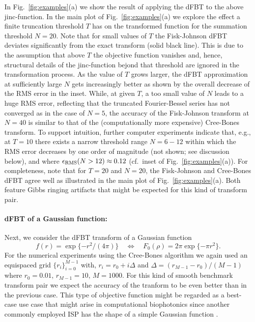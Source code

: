 \documentclass[12pt]{iopart}
\begin{document}
In Fig.~\ref{fig:examples}(a) we show the result of applying the dFBT to the
above {\rm jinc}-function. In the main plot of Fig.~\ref{fig:examples}(a) we
explore the effect a finite truncation threshold $T$ has on the transformed
function for the summation threshold $N=20$. Note that for small values of $T$
the Fisk-Johnson dFBT deviates significantly from the exact transform (solid
black line). This is due to the assumption that above $T$ the objective
function vanishes and, hence, structural details of the {\rm jinc}-function
bejond that threshold are ignored in the transformation process.  As the value
of $T$ grows larger, the dFBT approximation at sufficiently large $N$ gets
increasingly better as shown by the overall decrease of the RMS error in the
inset. While, at given $T$, a too small value of $N$ leads to a huge RMS error,
reflecting that the truncated Fourier-Bessel series has not converged as in the
case of $N=5$, the accuracy of the Fisk-Johnson transform at $N=40$ is similar
to that of the (computationally more expensive) Cree-Bones transform.
To support intuition, further computer experiments indicate that, e.g., at
$T=10$ there exists a narrow threshold range $N=6-12$ within which the RMS
error decreases by one order of magnitude (not shown; see discussion below), and
where $\epsilon_{\rm RMS}(N>12)\approx 0.12$ (cf.\ inset of
Fig.~\ref{fig:examples}(a)).  For completeness, note that for $T=20$ and
$N=20$, the Fisk-Johnson and Cree-Bones dFBT agree well as illustrated in the
main plot of Fig.~\ref{fig:examples}(a). Both feature Gibbs ringing artifacts
that might be expected for this kind of transform pair.

\paragraph{dFBT of a Gaussian function:}
Next, we consider the dFBT transform of a Gaussian function
\begin{equation}
f(r) = \exp\{-r^2/(4\pi)\} \quad \Longleftrightarrow \quad F_0(\rho)=2 \pi \exp\{-\pi r^2\}. \label{eq:FBP2}
\end{equation}
For the numerical experiments using the Cree-Bones algorithm we again used an
equispaced grid $\{r_i\}_{i=0}^{M-1}$ with, $r_i=r_0+i\Delta$ and
$\Delta=(r_{M-1}-r_{0})/(M-1)$ where $r_0 = 0.01$, $r_{M-1}=10$, $M=1000$. For this
kind of smooth benchmark transform pair we expect the accuracy of the tranform
to be even better than in the previous case.  This type of objective function
might be regarded as a best-case use case that might arise in computational
biophotonics since another commonly employed ISP has the shape of a simple
Gaussian function \cite{Paltauf:2000,CONV:1997}. 
\end{document}
